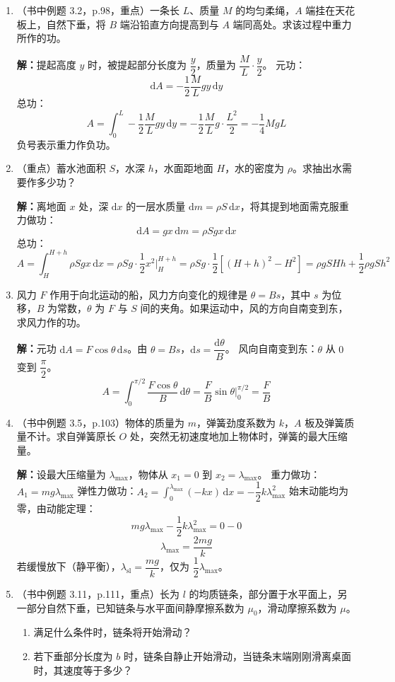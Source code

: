 \documentclass{ctexart}
\begin{document}
\begin{enumerate}
\item（书中例题 3.2，p.98，重点）一条长 $L$、质量 $M$ 的均匀柔绳，$A$ 端挂在天花板上，自然下垂，将 $B$ 端沿铅直方向提高到与 $A$ 端同高处。求该过程中重力所作的功。

\textbf{解：}提起高度 $y$ 时，被提起部分长度为 $\dfrac{y}{2}$，质量为 $\dfrac{M}{L}\cdot\dfrac{y}{2}$。
元功：
\[
\mathrm{d}A = -\frac12\frac{M}{L}gy\,\mathrm{d}y
\]
总功：
\[
A = \int_{0}^{L} -\frac12\frac{M}{L}gy\,\mathrm{d}y = -\frac12\frac{M}{L}g\cdot\frac{L^{2}}{2} = -\frac14 MgL
\]
负号表示重力作负功。

\item（重点）蓄水池面积 $S$，水深 $h$，水面距地面 $H$，水的密度为 $\rho$。求抽出水需要作多少功？

\textbf{解：}离地面 $x$ 处，深 $\mathrm{d}x$ 的一层水质量 $\mathrm{d}m = \rho S\,\mathrm{d}x$，将其提到地面需克服重力做功：
\[
\mathrm{d}A = gx\,\mathrm{d}m = \rho S g x\,\mathrm{d}x
\]
总功：
\[
A = \int_{H}^{H+h} \rho S g x\,\mathrm{d}x = \rho S g\cdot\frac12 x^{2}\Big|_{H}^{H+h}
= \rho S g\cdot\frac12[(H+h)^{2} - H^{2}]
= \rho g S H h + \frac12\rho g S h^{2}
\]

\item 风力 $F$ 作用于向北运动的船，风力方向变化的规律是 $\theta = Bs$，其中 $s$ 为位移，$B$ 为常数，$\theta$ 为 $F$ 与 $S$ 间的夹角。如果运动中，风的方向自南变到东，求风力作的功。

\textbf{解：}元功 $\mathrm{d}A = F\cos\theta\,\mathrm{d}s$。由 $\theta = Bs$，$\mathrm{d}s = \dfrac{\mathrm{d}\theta}{B}$。
风向自南变到东：$\theta$ 从 $0$ 变到 $\dfrac{\pi}{2}$。
\[
A = \int_{0}^{\pi/2} \frac{F\cos\theta}{B}\,\mathrm{d}\theta = \frac{F}{B}\sin\theta\Big|_{0}^{\pi/2} = \frac{F}{B}
\]

\item（书中例题 3.5，p.103）物体的质量为 $m$，弹簧劲度系数为 $k$，$A$ 板及弹簧质量不计。求自弹簧原长 $O$ 处，突然无初速度地加上物体时，弹簧的最大压缩量。

\textbf{解：}设最大压缩量为 $\lambda_{\text{max}}$，物体从 $x_1 = 0$ 到 $x_2 = \lambda_{\text{max}}$。
重力做功：$A_1 = mg\lambda_{\text{max}}$
弹性力做功：$A_2 = \int_{0}^{\lambda_{\text{max}}} (-kx)\,\mathrm{d}x = -\dfrac12 k\lambda_{\text{max}}^{2}$
始末动能均为零，由动能定理：
\[
mg\lambda_{\text{max}} - \frac12 k\lambda_{\text{max}}^{2} = 0 - 0
\]
\[
\lambda_{\text{max}} = \frac{2mg}{k}
\]
若缓慢放下（静平衡），$\lambda_{\text{sl}} = \dfrac{mg}{k}$，仅为 $\dfrac12\lambda_{\text{max}}$。

\item（书中例题 3.11，p.111，重点）长为 $l$ 的均质链条，部分置于水平面上，另一部分自然下垂，已知链条与水平面间静摩擦系数为 $\mu_0$，滑动摩擦系数为 $\mu$。
\begin{enumerate}
  \item 满足什么条件时，链条将开始滑动？
  \item 若下垂部分长度为 $b$ 时，链条自静止开始滑动，当链条末端刚刚滑离桌面时，其速度等于多少？
\end{enumerate}


\end{enumerate}
\end{document}
